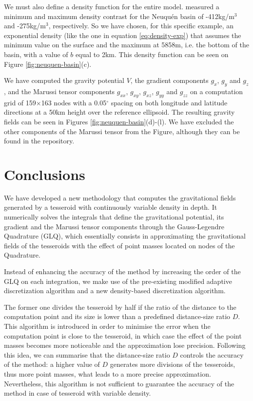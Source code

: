 \documentclass[extra]{gji}
\begin{document}
We must also define a density function for the entire model.
\citet{Sigismondi2012} measured a minimum and maximum density contrast for
the Neuqu\'en basin of -412kg/m$^3$ and -275kg/m$^3$, respectively.
So we have chosen, for this specific example, an exponential density (like the
one in equation \ref{eq:density-exp}) that assumes the minimum value on the
surface and the maximum at 5858m, i.e. the bottom of the basin, with a value
of $b$ equal to 2km.
This density function can be seen on Figure \ref{fig:neuquen-basin}(c).

We have computed the gravity potential $V$, the gradient components $g_x$,
$g_y$ and $g_z$, and the Marussi tensor components $g_{xx}$, $g_{xy}$,
$g_{xz}$, $g_{yy}$  and $g_{zz}$ on a computation grid of 159$\times$163 nodes
with a 0.05$^\circ$ spacing on both longitude and latitude directions at a
50km height over the reference ellipsoid.
The resulting gravity fields can be seen in Figures
\ref{fig:neuquen-basin}(d)-(l).
We have excluded the other components of the Marussi tensor from the Figure,
although they can be found in the repository.



\section{Conclusions}

We have developed a new methodology that computes the gravitational fields
generated by a tesseroid with continuously variable density in depth.
It numerically solves the integrals that define the gravitational potential,
its gradient and the Marussi tensor components through the Gauss-Legendre
Quadrature (GLQ), which essentially consists in approximating the
gravitational fields of the tesseroids with the effect of point masses located
on nodes of the Quadrature.

Instead of enhancing the accuracy of the method by increasing the order of the
GLQ on each integration, we make use of the pre-existing modified adaptive
discretization algorithm and a new density-based discretization algorithm.

The former one divides the tesseroid by half if the ratio of the distance to
the computation point and its size is lower than a predefined distance-size
ratio $D$.
This algorithm is introduced in order to minimise the error when the
computation point is close to the tesseroid, in which case the effect of the
point masses becomes more noticeable and the approximation lose precision.
Following this idea, we can summarise that the distance-size ratio $D$
controls the accuracy of the method: a higher value of $D$ generates more
divisions of the tesseroids, thus more point masses, what leads to a more
precise approximation.
Nevertheless, this algorithm is not sufficient to guarantee the accuracy of
the method in case of tesseroid with variable density.
\end{document}
